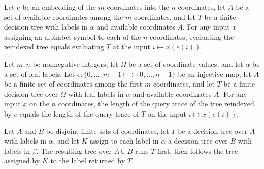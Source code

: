 \begin{theorem}
\label{FABL.FiniteDecisionTree.eval_reindex}
\leanok
{}
Let $e$ be an embedding of the $m$ coordinates into the $n$ coordinates, let $A$ be a
set of available coordinates among the $m$ coordinates, and let $T$ be a finite decision
tree with labels in $\alpha$ and available coordinates $A$. For any input $x$ assigning
an alphabet symbol to each of the $n$ coordinates, evaluating the reindexed tree equals
evaluating $T$ at the input $i\mapsto x(e(i))$.
\end{theorem}

\begin{theorem}
\label{FABL.FiniteDecisionTree.queryTrace_reindex_length}
\leanok
{}
Let $m,n$ be nonnegative integers, let $\Omega$ be a set of coordinate values, and let
$\alpha$ be a set of leaf labels. Let $e:\{0,\ldots,m-1\}\to\{0,\ldots,n-1\}$ be an
injective map, let $A$ be a finite set of coordinates among the first $m$ coordinates,
and let $T$ be a finite decision tree over $\Omega$ with leaf labels in $\alpha$ and
available coordinates $A$. For any input $x$ on the $n$ coordinates, the length of the
query trace of the tree reindexed by $e$ equals the length of the query trace of $T$ on
the input $i\mapsto x(e(i))$.
\end{theorem}

\begin{definition}
\label{FABL.FiniteDecisionTree.thenOnDisjoint}
\leanok
{}
Let $A$ and $B$ be disjoint finite sets of coordinates, let $T$ be a decision tree over
$A$ with labels in $\alpha$, and let $K$ assign to each label in $\alpha$ a decision
tree over $B$ with labels in $\beta$. The resulting tree over $A\cup B$ runs $T$ first,
then follows the tree assigned by $K$ to the label returned by $T$.
\end{definition}

